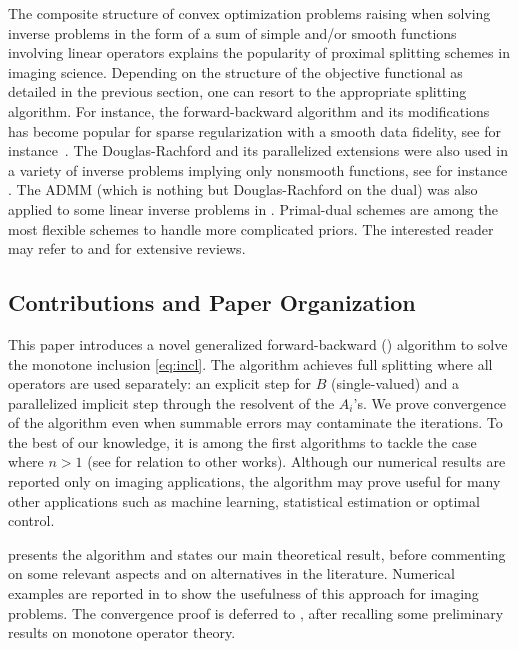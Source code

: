 The composite structure of convex optimization problems raising when solving inverse problems in the form of a sum of simple and/or smooth functions involving linear operators explains the popularity of proximal splitting schemes in imaging science. Depending on the structure of the objective functional as detailed in the previous section, one can resort to the appropriate splitting algorithm. For instance, the forward-backward algorithm and its modifications has become popular for sparse regularization with a smooth data fidelity, see for instance~\cite{BeckTeboulle09,Briceno-Arias09,Chaux07,CombettesWajs05,Daubechies04,Fadili06,FigueiredoNowak03}. The Douglas-Rachford and its parallelized extensions were also used in a variety of inverse problems implying only nonsmooth functions, see for instance \cite{Briceno-Arias10,Chaux09,Combettes07a,CombettesPesquet08,Dupe11a,Dupe09,Dupe12,Pustelnik11}. The ADMM (which is nothing but Douglas-Rachford on the dual) was also applied to some linear inverse problems in \cite{Figueiredo10a,Figueiredo10b}. Primal-dual schemes \cite{ChambollePock11,Dupe11b} are among the most flexible schemes to handle more complicated priors. The interested reader may refer to \cite[Chapter 7]{FadiliStarckBook09} and \cite{CombettesPesquet09} for extensive reviews.

\subsection{Contributions and Paper Organization}

This paper introduces a novel generalized forward-backward (\GFB) algorithm to solve the monotone inclusion \eqref{eq:incl}. The algorithm achieves full splitting where all operators are used separately: an explicit step for $B$ (single-valued) and a parallelized implicit step through the resolvent of the $A_i$'s. We prove convergence of the algorithm even when summable errors may contaminate the iterations. To the best of our knowledge, it is among the first algorithms to tackle the case where $n > 1$ (see  for relation to other works). Although our numerical results are reported only on imaging applications, the algorithm may prove useful for many other applications such as machine learning, statistical estimation or optimal control.

 presents the algorithm and states our main theoretical result, before commenting on some relevant aspects and on alternatives in the literature. Numerical examples are reported in  to show the usefulness of this approach for imaging problems. The convergence proof is deferred to , after recalling some preliminary results on monotone operator theory.

